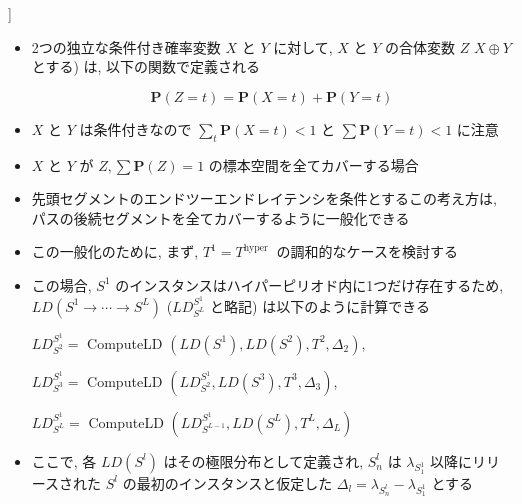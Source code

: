 \begin{frame}{}
    \begin{definition}[Coalescion [3]]
        \setlength{\linewidth}{0.98\columnwidth}
        \begin{itemize}
            \item 2つの独立な条件付き確率変数 $X$ と $Y$ に対して, $X$ と $Y$ の合体変数 $Z$ $X \oplus Y$ とする) は, 以下の関数で定義される

                  \begin{equation*}
                      \mathbf{P}(Z=t)=\mathbf{P}(X=t)+\mathbf{P}(Y=t)
                  \end{equation*}

            \item $X$ と $Y$ は条件付きなので $\sum_{t} \mathbf{P}(X=t)<1$ と $\sum \mathbf{P}(Y=t)<1$ に注意
            \item $X$ と $Y$ が $Z, \sum \mathbf{P}(Z)=1$ の標本空間を全てカバーする場合
        \end{itemize}
    \end{definition}
\end{frame}

\begin{frame}{}
    \begin{itemize}
        \item 先頭セグメントのエンドツーエンドレイテンシを条件とするこの考え方は, パスの後続セグメントを全てカバーするように一般化できる
        \item この一般化のために, まず, $T^{1}=T^{\text {hyper }}$ の調和的なケースを検討する
        \item この場合, $S^{1}$ のインスタンスはハイパーピリオド内に1つだけ存在するため, $L D\left(S^{1} \rightarrow \cdots \rightarrow S^{L}\right)$ ($L D_{S^{L}}^{S^{1}}$ と略記) は以下のように計算できる

              $L D_{S^{2}}^{S^{1}}=$ ComputeLD $\left(L D\left(S^{1}\right), L D\left(S^{2}\right), T^{2}, \Delta_{2}\right)$,

              $L D_{S^{3}}^{S^{1}}=$ ComputeLD $\left(L D_{S^{2}}^{S^{1}}, L D\left(S^{3}\right), T^{3}, \Delta_{3}\right)$,

              $L D_{S^{L}}^{S^{1}}=$ ComputeLD $\left(L D_{S^{L-1}}^{S^{1}}, L D\left(S^{L}\right), T^{L}, \Delta_{L}\right)$

        \item ここで, 各 $L D\left(S^{l}\right)$ はその極限分布として定義され, $S_{n}^{l}$ は $\lambda_{S_{1}^{1}}$ 以降にリリースされた $S^{l}$ の最初のインスタンスと仮定した $\Delta_{l}=\lambda_{S_{n}^{l}}-\lambda_{S_{1}^{1}}$ とする
    \end{itemize}
\end{frame}


